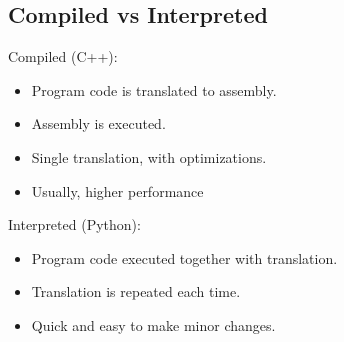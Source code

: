 \subsection{Compiled vs Interpreted}
Compiled (C++):
\begin{itemize}
    \item Program code is translated to assembly.
    \item Assembly is executed.
    \item Single translation, with optimizations.
    \item Usually, higher performance
\end{itemize}
Interpreted (Python):
\begin{itemize}
    \item Program code executed together with translation.
    \item Translation is repeated each time.
    \item Quick and easy to make minor changes.
\end{itemize}

